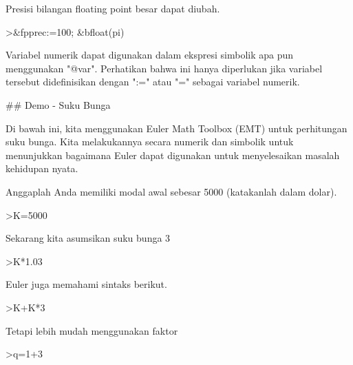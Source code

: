\documentclass[a4paper,10pt]{article}
\begin{document}
\begin{eulernotebook}
\begin{euleroutput}
  Presisi bilangan floating point besar dapat diubah.
  
\end{euleroutput}
\begin{eulerprompt}
>&fpprec:=100; &bfloat(pi)
\end{eulerprompt}
\begin{euleroutput}
  
  Variabel numerik dapat digunakan dalam ekspresi simbolik apa pun menggunakan "@var". Perhatikan bahwa ini hanya diperlukan jika variabel tersebut didefinisikan dengan ":=" atau "=" sebagai variabel numerik.
  
\end{euleroutput}
\begin{euleroutput}
  
  ## Demo - Suku Bunga
  
  Di bawah ini, kita menggunakan Euler Math Toolbox (EMT) untuk perhitungan suku bunga. Kita melakukannya secara numerik dan simbolik untuk menunjukkan bagaimana Euler dapat digunakan untuk menyelesaikan masalah kehidupan nyata.
  
  Anggaplah Anda memiliki modal awal sebesar 5000 (katakanlah dalam dolar).
  
\end{euleroutput}
\begin{eulerprompt}
>K=5000
\end{eulerprompt}
\begin{euleroutput}
  
  Sekarang kita asumsikan suku bunga 3%
  
\end{euleroutput}
\begin{eulerprompt}
>K*1.03
\end{eulerprompt}
\begin{euleroutput}
  
  Euler juga memahami sintaks berikut.
  
\end{euleroutput}
\begin{eulerprompt}
>K+K*3%
\end{eulerprompt}
\begin{euleroutput}
  
  Tetapi lebih mudah menggunakan faktor
  
\end{euleroutput}
\begin{eulerprompt}
>q=1+3%
\end{eulerprompt}
\begin{euleroutput}
  

\end{euleroutput}
\end{eulernotebook}
\end{document}
